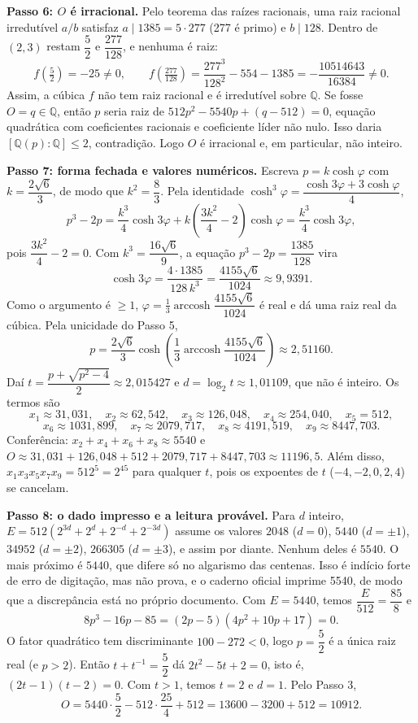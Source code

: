 \documentclass{article}%
\begin{document}
\textbf{Passo 6: $O$ é irracional.} Pelo teorema das raízes racionais, uma raiz racional irredutível $a/b$ satisfaz $a\mid 1385=5\cdot 277$ (277 é primo) e $b\mid 128$. Dentro de $(2,3)$ restam $\dfrac52$ e $\dfrac{277}{128}$, e nenhuma é raiz:
\[
f\!\left(\tfrac52\right)=-25\neq 0,\qquad f\!\left(\tfrac{277}{128}\right)=\frac{277^3}{128^2}-554-1385=-\frac{10514643}{16384}\neq 0.
\]
Assim, a cúbica $f$ não tem raiz racional e é irredutível sobre $\mathbb{Q}$. Se fosse $O=q\in\mathbb{Q}$, então $p$ seria raiz de $512p^2-5540p+(q-512)=0$, equação quadrática com coeficientes racionais e coeficiente líder não nulo. Isso daria $[\mathbb{Q}(p):\mathbb{Q}]\le 2$, contradição. Logo $O$ é irracional e, em particular, não inteiro.

\textbf{Passo 7: forma fechada e valores numéricos.} Escreva $p=k\cosh\varphi$ com $k=\dfrac{2\sqrt6}{3}$, de modo que $k^2=\dfrac83$. Pela identidade $\cosh^3\varphi=\dfrac{\cosh 3\varphi+3\cosh\varphi}{4}$,
\[
p^3-2p=\frac{k^3}{4}\cosh 3\varphi+k\left(\frac{3k^2}{4}-2\right)\cosh\varphi=\frac{k^3}{4}\cosh 3\varphi,
\]
pois $\dfrac{3k^2}{4}-2=0$. Com $k^3=\dfrac{16\sqrt6}{9}$, a equação $p^3-2p=\dfrac{1385}{128}$ vira
\[
\cosh 3\varphi=\frac{4\cdot 1385}{128\,k^3}=\frac{4155\sqrt6}{1024}\approx 9{,}9391.
\]
Como o argumento é $\ge 1$, $\varphi=\frac13\operatorname{arccosh}\dfrac{4155\sqrt6}{1024}$ é real e dá uma raiz real da cúbica. Pela unicidade do Passo 5,
\[
p=\frac{2\sqrt6}{3}\cosh\!\left(\frac13\operatorname{arccosh}\frac{4155\sqrt6}{1024}\right)\approx 2{,}51160.
\]
Daí $t=\dfrac{p+\sqrt{p^2-4}}{2}\approx 2{,}015427$ e $d=\log_2 t\approx 1{,}01109$, que não é inteiro. Os termos são
\[
x_1\approx 31{,}031,\quad x_2\approx 62{,}542,\quad x_3\approx 126{,}048,\quad x_4\approx 254{,}040,\quad x_5=512,
\]
\[
x_6\approx 1031{,}899,\quad x_7\approx 2079{,}717,\quad x_8\approx 4191{,}519,\quad x_9\approx 8447{,}703.
\]
Conferência: $x_2+x_4+x_6+x_8\approx 5540$ e $O\approx 31{,}031+126{,}048+512+2079{,}717+8447{,}703\approx 11196{,}5$. Além disso, $x_1x_3x_5x_7x_9=512^5=2^{45}$ para qualquer $t$, pois os expoentes de $t$ ($-4,-2,0,2,4$) se cancelam.

\textbf{Passo 8: o dado impresso e a leitura provável.} Para $d$ inteiro, $E=512\left(2^{3d}+2^{d}+2^{-d}+2^{-3d}\right)$ assume os valores $2048$ ($d=0$), $5440$ ($d=\pm1$), $34952$ ($d=\pm2$), $266305$ ($d=\pm3$), e assim por diante. Nenhum deles é $5540$. O mais próximo é $5440$, que difere só no algarismo das centenas. Isso é indício forte de erro de digitação, mas não prova, e o caderno oficial imprime 5540, de modo que a discrepância está no próprio documento. Com $E=5440$, temos $\dfrac{E}{512}=\dfrac{85}{8}$ e
\[
8p^3-16p-85=(2p-5)(4p^2+10p+17)=0.
\]
O fator quadrático tem discriminante $100-272<0$, logo $p=\dfrac52$ é a única raiz real (e $p>2$). Então $t+t^{-1}=\dfrac52$ dá $2t^2-5t+2=0$, isto é, $(2t-1)(t-2)=0$. Com $t>1$, temos $t=2$ e $d=1$. Pelo Passo 3,
\[
O=5440\cdot\frac52-512\cdot\frac{25}{4}+512=13600-3200+512=10912.
\]
\end{document}
